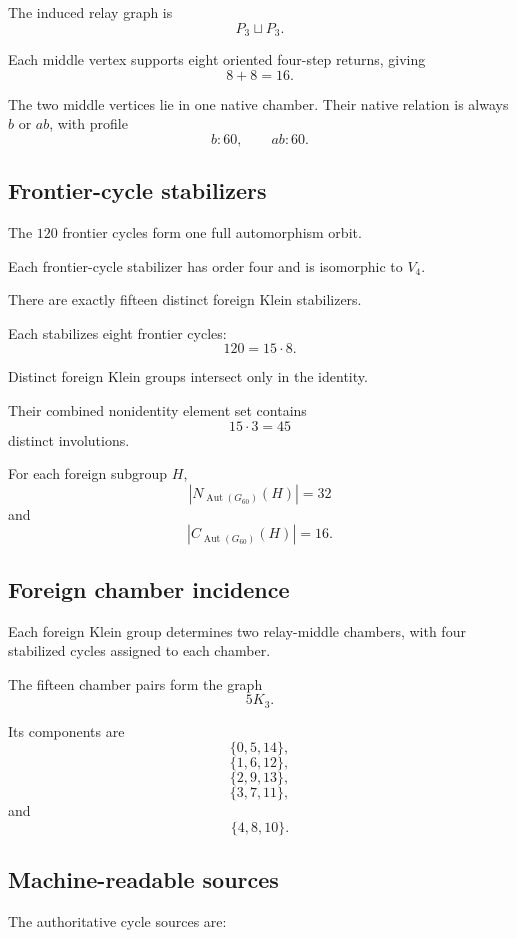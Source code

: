 The induced relay graph is
\[
P_3\sqcup P_3.
\]

Each middle vertex supports eight oriented four-step returns, giving
\[
8+8=16.
\]

The two middle vertices lie in one native chamber. Their native
relation is always \(b\) or \(ab\), with profile
\[
b:60,
\qquad
ab:60.
\]

\subsection{Frontier-cycle stabilizers}

The \(120\) frontier cycles form one full automorphism orbit.

Each frontier-cycle stabilizer has order four and is isomorphic to
\(V_4\).

There are exactly fifteen distinct foreign Klein stabilizers.

Each stabilizes eight frontier cycles:
\[
120=15\cdot8.
\]

Distinct foreign Klein groups intersect only in the identity.

Their combined nonidentity element set contains
\[
15\cdot3=45
\]
distinct involutions.

For each foreign subgroup \(H\),
\[
|N_{\operatorname{Aut}(G_{60})}(H)|=32
\]
and
\[
|C_{\operatorname{Aut}(G_{60})}(H)|=16.
\]

\subsection{Foreign chamber incidence}

Each foreign Klein group determines two relay-middle chambers, with
four stabilized cycles assigned to each chamber.

The fifteen chamber pairs form the graph
\[
5K_3.
\]

Its components are
\[
\{0,5,14\},
\]
\[
\{1,6,12\},
\]
\[
\{2,9,13\},
\]
\[
\{3,7,11\},
\]
and
\[
\{4,8,10\}.
\]

\subsection{Machine-readable sources}

The authoritative cycle sources are:

